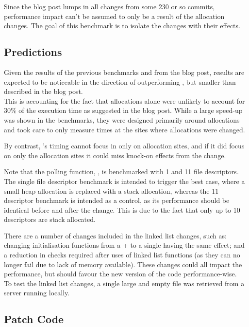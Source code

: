 Since the blog post lumps in all changes from some 230 or so commits, performance impact can't be assumed to only be a result of the allocation changes. The goal of this benchmark is to isolate the changes with their effects.

\subsection{Predictions}

Given the results of the previous benchmarks and from the blog post, results are expected to be noticeable in the direction of outperforming \malloc{}, but smaller than described in the blog post.\\
This is accounting for the fact that allocations alone were unlikely to account for 30\% of the execution time as suggested in the blog post. While a large speed-up was shown in the benchmarks, they were designed primarily around allocations and took care to only measure times at the sites where allocations were changed.

By contrast, 's timing cannot focus in only on allocation sites, and if it did focus on only the allocation sites it could miss knock-on effects from the change.

Note that the polling function, , is benchmarked with 1 and 11 file descriptors. The single file descriptor benchmark is intended to trigger the best case, where a small heap allocation is replaced with a stack allocation, whereas the 11 descriptor benchmark is intended as a control, as its performance should be identical before and after the change. This is due to the fact that only up to 10 descriptors are stack allocated.

There are a number of changes included in the linked list changes, such as: changing initialisation functions from a \malloc{}+ to a single  having the same effect; and a reduction in checks required after uses of linked list functions (as they can no longer fail due to lack of memory available). These changes could all impact the performance, but should favour the new version of the code performance-wise.\\
To test the linked list changes, a single large and empty file was retrieved from a server running locally.

\subsection{Patch Code}

